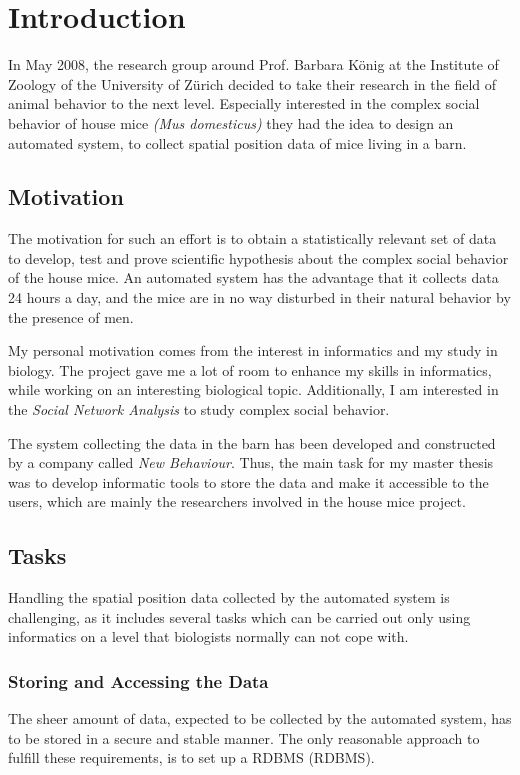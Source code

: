 \newpage

\section{Introduction}
\label{sec:introduction}

In May 2008, the research group around Prof. Barbara K\"onig at the Institute of Zoology of the University of Z\"urich decided to take their research in the field of animal behavior to the next level. Especially interested in the complex social behavior of house mice \textit{(Mus domesticus)} they had the idea to design an automated system, to collect spatial position data of mice living in a barn.

\subsection{Motivation}
\label{subsec:motivation}
The motivation for such an effort is to obtain a statistically relevant set of data to develop, test and prove scientific hypothesis about the complex social behavior of the house mice. An automated system has the advantage that it collects data 24 hours a day, and the mice are in no way disturbed in their natural behavior by the presence of men.

My personal motivation comes from the interest in informatics and my study in biology. The project gave me a lot of room to enhance my skills in informatics, while working on an interesting biological topic. Additionally, I am interested in the \textit{Social Network Analysis} to study complex social behavior.

The system collecting the data in the barn has been developed and constructed by a company called \textit{New Behaviour}. Thus, the main task for my master thesis was to develop informatic tools to store the data and make it accessible to the users, which are mainly the researchers involved in the house mice project. 

\subsection{Tasks}
\label{subsec:task}
Handling the spatial position data collected by the automated system is challenging, as it includes several tasks which can be carried out only using informatics on a level that biologists normally can not cope with.

\subsubsection{Storing and Accessing the Data}
\label{subsubsec:storeaccess}
The sheer amount of data, expected to be collected by the automated system, has to be stored in a secure and stable manner. The only reasonable approach to fulfill these requirements, is to set up a \ac{RDBMS} (RDBMS). 

